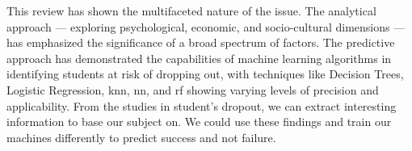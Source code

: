 \documentclass[../../main.tex]{subfiles}
\begin{document}
This review has shown the multifaceted nature of the issue. The analytical approach — exploring psychological, economic, and socio-cultural dimensions — has emphasized the significance of a broad spectrum of factors. The predictive approach has demonstrated the capabilities of machine learning algorithms in identifying students at risk of dropping out, with techniques like Decision Trees, Logistic Regression, \acrfull{knn}, \acrfull{nn}, and \acrfull{rf} showing varying levels of precision and applicability.
From the studies in student's dropout, we can extract interesting information to base our subject on. We could use these findings and train our machines differently to predict success and not failure.
\end{document}
